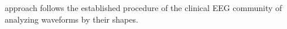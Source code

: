 approach follows the established procedure of the clinical EEG community of analyzing waveforms by their shapes.




%
%


%



